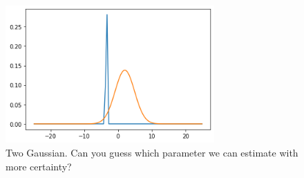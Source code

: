 \documentclass{article}
\begin{document}
\begin{figure}[h!]
\centering
\caption{Two Gaussian. Can you guess which parameter we can estimate with more certainty?}
\label{f:g}
\includegraphics[width=8cm]{two_gauss}
\end{figure}
\end{document}
